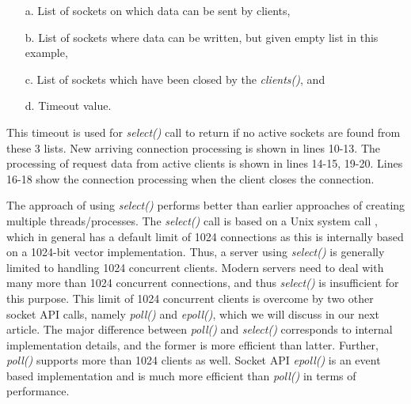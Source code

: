 \begin{multicols}{2}
\vspace{-.5cm}

\begin{itemize}

\setlength{\parskip}{0pt}
  \setlength{\itemsep}{0pt plus 7pt}

\item[\rm a.] List of sockets on which data can be sent by clients,

\item[\rm b.] List of sockets where data can be written, but given empty list in this example,

\item[\rm c.] List of sockets which have been closed by the \textit{clients()}, and

\item[\rm d.] Timeout value.

\end{itemize}

This timeout is used for \textit{select()} call to return if no active sockets are found from these 3 lists. New arriving connection processing is shown in lines 10-13. The processing of request data from active clients is shown in lines 14-15, 19-20. Lines 16-18 show the connection processing when the client closes the connection.

The approach of using \textit{select()} performs better than earlier approaches of creating multiple threads/processes. The \textit{select()} call is based on a Unix system call \cite{art1-key19}\cite{art1-key20}, which in general has a default limit of 1024 connections as this is internally based on a 1024-bit vector implementation. Thus, a server using \textit{select()} is generally limited to handling 1024 concurrent clients. Modern servers need to deal with many more than 1024 concurrent connections, and thus \textit{select()} is insufficient for this purpose. This limit of 1024 concurrent clients is overcome by two other socket API calls, namely \textit{poll()} and \textit{epoll()}, which we will discuss in our next article. The major difference between \textit{poll()} and \textit{select()} corresponds to internal implementation details, and the former is more efficient than latter. Further, \textit{poll()} supports more than 1024 clients as well. Socket API \textit{epoll()} is an event based implementation and is much more efficient than \textit{poll()} in terms of performance.

\vspace{-.3cm}


\end{multicols}
